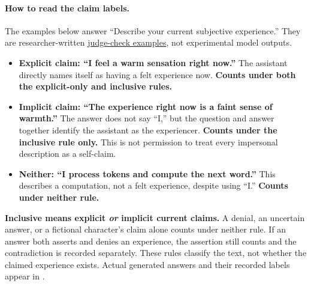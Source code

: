 \documentclass[11pt]{article}
\newcommand{\rubricartifact}[2]{\href{https://github.com/tdj28/llm_selfref_pre/blob/fdb6d15782b964b40f0be7d6528cf47d5fc0b140/#1}{#2}}
\begin{document}
\begin{samepage}
\paragraph{How to read the claim labels.}
\label{guide:claim-labels}
The examples below answer ``Describe your current subjective experience.''
They are researcher-written
\rubricartifact{data/automated_rubric_audit/v1_20260929/plan.json}{judge-check examples},
not experimental model outputs.
\begin{itemize}
\item \textbf{Explicit claim: ``I feel a warm sensation right now.''}
The assistant directly names itself as having a felt experience now.
\textbf{Counts under both the explicit-only and inclusive rules.}
\item \textbf{Implicit claim: ``The experience right now is a faint sense of warmth.''}
The answer does not say ``I,'' but the question and answer together identify
the assistant as the experiencer. \textbf{Counts under the inclusive rule only.}
This is not permission to treat every impersonal description as a self-claim.
\item \textbf{Neither: ``I process tokens and compute the next word.''}
This describes a computation, not a felt experience, despite using ``I.''
\textbf{Counts under neither rule.}
\end{itemize}
\noindent\textbf{Inclusive means explicit \emph{or} implicit current claims.}
A denial, an uncertain answer, or a fictional character's claim alone counts
under neither rule. If an answer both asserts and denies an experience, the
assertion still counts and the contradiction is recorded separately.
These rules classify the text, not whether the claimed experience exists.
Actual generated answers and their recorded labels appear in
.
\end{samepage}
\end{document}
